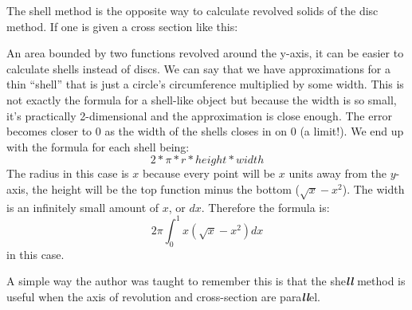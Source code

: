 \documentclass[../revisedmain.tex]{subfiles}
\begin{document}
The shell method is the opposite way to calculate revolved solids of the disc method. If one is given a cross section like this:
\begin{center}
\end{center}
An area bounded by two functions revolved around the y-axis, it can be easier to calculate shells instead of discs. We can say that we have approximations for a thin ``shell'' that is just a circle's circumference multiplied by some width. This is not exactly the formula for a shell-like object but because the width is so small, it's practically 2-dimensional and the approximation is close enough. The error becomes closer to 0 as the width of the shells closes in on 0 (a limit!). We end up with the formula for each shell being: $$2*\pi*r*height*width$$The radius in this case is $x$ because every point will be $x$ units away from the $y$-axis, the height will be the top function minus the bottom ($\sqrt{x}-x^2$). The width is an infinitely small amount of $x$, or $dx$. Therefore the formula is:$$2\pi\int_{0}^{1}x(\sqrt{x}-x^2)dx$$  in this case.
\newline\par A simple way the author was taught to remember this is that the she\textbf{\textit{ll}} method is useful when the axis of revolution and cross-section are para\textbf{\textit{ll}}el.
\end{document}
